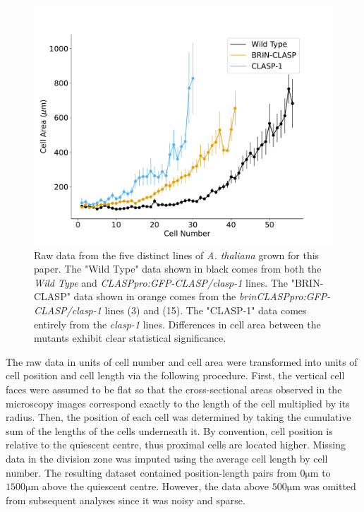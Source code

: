 \documentclass[referee,pdflatex,sn-mathphys-num]{sn-jnl}
\newcommand{\um}{\unit{\micro\metre}}
\begin{document}
\begin{appendices}
\begin{figure}
  \centering
  \includegraphics[width=\textwidth]{data-unprocessed.pdf}
  \caption{Raw data from the five distinct lines of \emph{A. thaliana} grown for this paper. The "Wild Type" data shown in black comes from both the \emph{Wild Type} and \emph{CLASPpro:GFP-CLASP/clasp-1} lines. The "BRIN-CLASP" data shown in orange comes from the \emph{brinCLASPpro:GFP-CLASP/clasp-1} lines (3) and (15). The "CLASP-1" data comes entirely from the \emph{clasp-1} lines. Differences in cell area between the mutants exhibit clear statistical significance. }
  \label{data-unprocesed}
\end{figure}

The raw data in units of cell number and cell area were transformed into units of cell position and cell length via the following procedure. First, the vertical cell faces were assumed to be flat so that the cross-sectional areas observed in the microscopy images correspond exactly to the length of the cell multiplied by its radius. Then, the position of each cell was determined by taking the cumulative sum of the lengths of the cells underneath it. By convention, cell position is relative to the quiescent centre, thus proximal cells are located higher. Missing data in the division zone was imputed using the average cell length by cell number. The resulting dataset contained position-length pairs from $0\um$ to $1500\um$ above the quiescent centre. However, the data above $500\um$ was omitted from subsequent analyses since it was noisy and sparse. 


\end{appendices}
\end{document}
